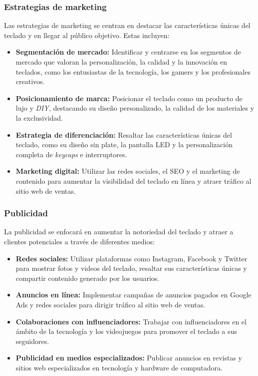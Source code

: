 \subsubsection{Estrategias de marketing}

Las estrategias de marketing se centran en destacar las características únicas del teclado y en llegar al público objetivo. Estas incluyen:

\begin{itemize}
    \item \textbf{Segmentación de mercado:} Identificar y centrarse en los segmentos de mercado que valoran la personalización, la calidad y la innovación en teclados, como los entusiastas de la tecnología, los gamers y los profesionales creativos.
    \item \textbf{Posicionamiento de marca:} Posicionar el teclado como un producto de lujo y \textit{DIY}, destacando su diseño personalizado, la calidad de los materiales y la exclusividad.
    \item \textbf{Estrategia de diferenciación:} Resaltar las características únicas del teclado, como su diseño sin plate, la pantalla LED y la personalización completa de \textit{keycaps} e interruptores.
    \item \textbf{Marketing digital:} Utilizar las redes sociales, el SEO y el marketing de contenido para aumentar la visibilidad del teclado en línea y atraer tráfico al sitio web de ventas.
\end{itemize}

\subsubsection{Publicidad}

La publicidad se enfocará en aumentar la notoriedad del teclado y atraer a clientes potenciales a través de diferentes medios:

\begin{itemize}
    \item \textbf{Redes sociales:} Utilizar plataformas como Instagram, Facebook y Twitter para mostrar fotos y videos del teclado, resaltar sus características únicas y compartir contenido generado por los usuarios.
    \item \textbf{Anuncios en línea:} Implementar campañas de anuncios pagados en Google Ads y redes sociales para dirigir tráfico al sitio web de ventas.
    \item \textbf{Colaboraciones con influenciadores:} Trabajar con influenciadores en el ámbito de la tecnología y los videojuegos para promover el teclado a sus seguidores.
    \item \textbf{Publicidad en medios especializados:} Publicar anuncios en revistas y sitios web especializados en tecnología y hardware de computadora.
\end{itemize}

